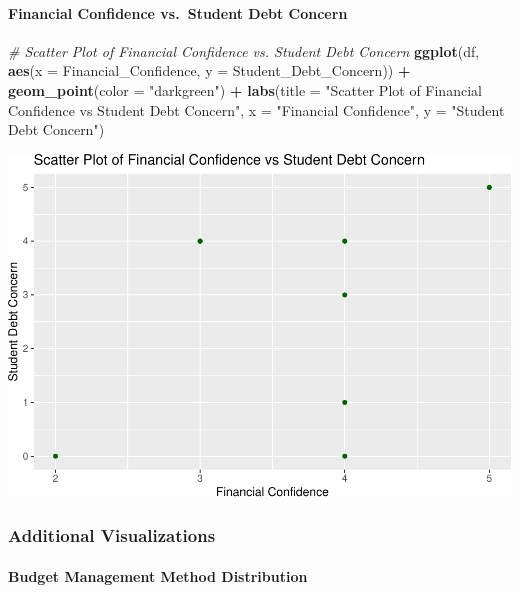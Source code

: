 \documentclass[
]{article}
\newenvironment{Shaded}{\begin{snugshade}}{\end{snugshade}}
\newcommand{\AttributeTok}[1]{\textcolor[rgb]{0.13,0.29,0.53}{#1}}
\newcommand{\CommentTok}[1]{\textcolor[rgb]{0.56,0.35,0.01}{\textit{#1}}}
\newcommand{\FunctionTok}[1]{\textcolor[rgb]{0.13,0.29,0.53}{\textbf{#1}}}
\newcommand{\NormalTok}[1]{#1}
\newcommand{\SpecialCharTok}[1]{\textcolor[rgb]{0.81,0.36,0.00}{\textbf{#1}}}
\newcommand{\StringTok}[1]{\textcolor[rgb]{0.31,0.60,0.02}{#1}}
\begin{document}
\paragraph{Financial Confidence vs.~Student Debt
Concern}\label{financial-confidence-vs.-student-debt-concern}

\begin{Shaded}
\begin{Highlighting}[]
\CommentTok{\# Scatter Plot of Financial Confidence vs. Student Debt Concern}
\FunctionTok{ggplot}\NormalTok{(df, }\FunctionTok{aes}\NormalTok{(}\AttributeTok{x =}\NormalTok{ Financial\_Confidence, }\AttributeTok{y =}\NormalTok{ Student\_Debt\_Concern)) }\SpecialCharTok{+}
  \FunctionTok{geom\_point}\NormalTok{(}\AttributeTok{color =} \StringTok{"darkgreen"}\NormalTok{) }\SpecialCharTok{+}
  \FunctionTok{labs}\NormalTok{(}\AttributeTok{title =} \StringTok{"Scatter Plot of Financial Confidence vs Student Debt Concern"}\NormalTok{,}
       \AttributeTok{x =} \StringTok{"Financial Confidence"}\NormalTok{, }\AttributeTok{y =} \StringTok{"Student Debt Concern"}\NormalTok{)}
\end{Highlighting}
\end{Shaded}

\includegraphics{Project1_files/figure-latex/unnamed-chunk-9-1.pdf}

\subsubsection{Additional
Visualizations}\label{additional-visualizations}

\paragraph{Budget Management Method
Distribution}\label{budget-management-method-distribution}
\end{document}
